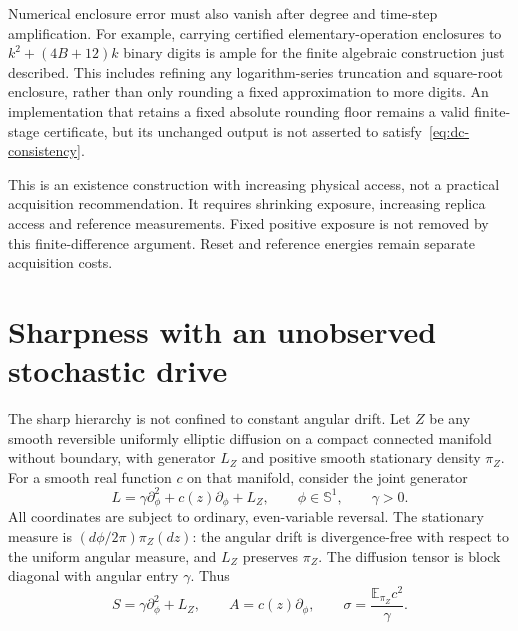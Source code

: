 Numerical enclosure error must also vanish after degree and time-step
amplification.  For example, carrying certified elementary-operation
enclosures to $k^2+(4B+12)k$ binary digits is ample for the finite algebraic
construction just described.  This includes refining any logarithm-series
truncation and square-root enclosure, rather than only rounding a fixed
approximation to more digits.  An implementation that retains a fixed
absolute rounding floor remains a valid finite-stage certificate, but its
unchanged output is not asserted to satisfy~\eqref{eq:dc-consistency}.

This is an existence construction with increasing physical access, not a
practical acquisition recommendation.  It requires shrinking exposure,
increasing replica access and reference measurements.  Fixed positive
exposure is not removed by this finite-difference argument.  Reset and
reference energies remain separate acquisition costs.

\section{Sharpness with an unobserved stochastic drive}

The sharp hierarchy is not confined to constant angular drift.  Let $Z$ be
any smooth reversible uniformly elliptic diffusion on a compact connected
manifold without boundary, with generator $L_Z$ and positive smooth
stationary density $\pi_Z$.  For a smooth real function $c$ on that manifold,
consider the joint generator
\begin{equation}
 L=\gamma\partial_\phi^2+c(z)\partial_\phi+L_Z,
 \qquad \phi\in\mathbb S^1,\qquad \gamma>0.
 \label{eq:dc-modulated-generator}
\end{equation}
All coordinates are subject to ordinary, even-variable reversal.  The
stationary measure is $(d\phi/2\pi)\pi_Z(dz)$: the angular drift is
divergence-free with respect to the uniform angular measure, and $L_Z$
preserves $\pi_Z$.  The diffusion tensor is block diagonal with angular
entry $\gamma$.  Thus
\begin{equation}
 S=\gamma\partial_\phi^2+L_Z,\qquad
 A=c(z)\partial_\phi,\qquad
 \sigma=\frac{\mathbb E_{\pi_Z}c^2}{\gamma}.
 \label{eq:dc-modulated-entropy}
\end{equation}


